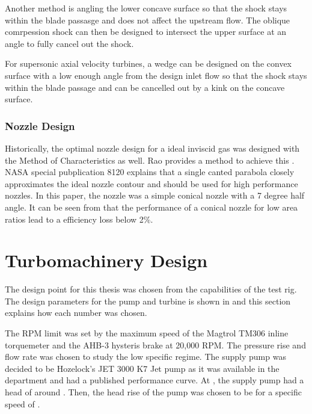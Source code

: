 Another method is angling the lower concave surface so that the shock stays within the blade passasge and does not affect the upstream flow. The oblique comrpession shock can then be designed to intersect the upper surface at an angle to fully cancel out the shock.

For supersonic axial velocity turbines, a wedge can be designed on the convex surface with a low enough angle from the design inlet flow so that the shock stays within the blade passage and can be cancelled out by a kink on the concave surface.



\subsubsection{Nozzle Design}

Historically, the optimal nozzle design for a ideal inviscid gas was designed with the Method of Characteristics as well. Rao provides a method to achieve this \cite{raonozzledesign}. NASA special pubplication 8120 explains that a single canted parabola closely approximates the ideal nozzle contour and should be used for high performance nozzles. In this paper, the nozzle was a simple conical nozzle with a 7 degree half angle. It can be seen from  that the performance of a conical nozzle for low area ratios lead to a efficiency loss below 2\%.

\section{Turbomachinery Design}

The design point for this thesis was chosen from the capabilities of the test rig. The design parameters for the pump and turbine is shown in  and this section explains how each number was chosen.

The RPM limit was set by the maximum speed of the Magtrol TM306 inline torquemeter and the AHB-3 hysteris brake at 20,000 RPM. The pressure rise and flow rate was chosen to study the low specific regime. The supply pump was decided to be Hozelock's JET 3000 K7 Jet pump as it was available in the department and had a published performance curve. At \valPumpMdotDesign, the supply pump had a head of around \valSupplyPumpHeadDesign. Then, the head rise of the pump was chosen to be \valPumpPressureDesign for a specific speed of .



